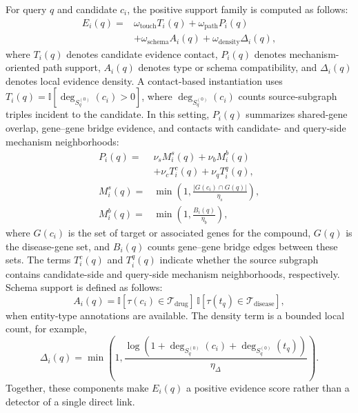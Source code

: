 \documentclass[pdflatex,sn-mathphys-num]{sn-jnl}
\begin{document}
For query $q$ and candidate $c_i$, the positive support family is computed as follows:
\begin{equation}
\begin{aligned}
E_i(q)=&
\omega_{\mathrm{touch}}T_i(q)+\omega_{\mathrm{path}}P_i(q)\\
&+\omega_{\mathrm{schema}}A_i(q)+\omega_{\mathrm{density}}\Delta_i(q),
\end{aligned}
\label{eq:evidence_support}
\end{equation}
where $T_i(q)$ denotes candidate evidence contact, $P_i(q)$ denotes mechanism-oriented path support, $A_i(q)$ denotes type or schema compatibility, and $\Delta_i(q)$ denotes local evidence density. A contact-based instantiation uses $T_i(q)=\mathbb{I}[\deg_{S^{(0)}_q}(c_i)>0]$, where $\deg_{S^{(0)}_q}(c_i)$ counts source-subgraph triples incident to the candidate. In this setting, $P_i(q)$ summarizes shared-gene overlap, gene--gene bridge evidence, and contacts with candidate- and query-side mechanism neighborhoods:
\begin{equation}
\begin{aligned}
P_i(q)=&
\nu_sM^s_i(q)+\nu_bM^b_i(q)\\
&+\nu_cT^c_i(q)+\nu_qT^q_i(q),\\
M^s_i(q)=&
\min\left(1,\frac{|G(c_i)\cap G(q)|}{\eta_s}\right),\\
M^b_i(q)=&
\min\left(1,\frac{B_i(q)}{\eta_b}\right),
\end{aligned}
\label{eq:path_support}
\end{equation}
where $G(c_i)$ is the set of target or associated genes for the compound, $G(q)$ is the disease-gene set, and $B_i(q)$ counts gene--gene bridge edges between these sets. The terms $T^c_i(q)$ and $T^q_i(q)$ indicate whether the source subgraph contains candidate-side and query-side mechanism neighborhoods, respectively. Schema support is defined as follows:
\begin{equation}
A_i(q)=
\mathbb{I}[\tau(c_i)\in\mathcal{T}_{\mathrm{drug}}]\,
\mathbb{I}[\tau(t_q)\in\mathcal{T}_{\mathrm{disease}}],
\label{eq:schema_support}
\end{equation}
when entity-type annotations are available. The density term is a bounded local count, for example,
\begin{equation}
\Delta_i(q)=
\min\left(1,\frac{\log(1+\deg_{S^{(0)}_q}(c_i)+\deg_{S^{(0)}_q}(t_q))}{\eta_\Delta}\right).
\label{eq:density_support}
\end{equation}
Together, these components make $E_i(q)$ a positive evidence score rather than a detector of a single direct link.
\end{document}
